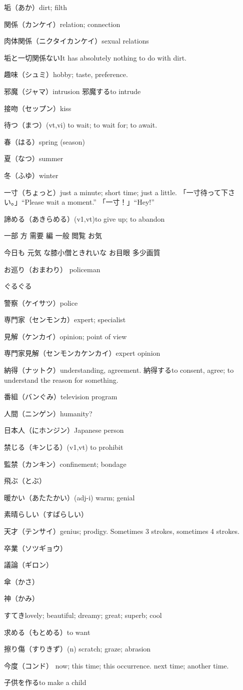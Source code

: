 垢（あか）dirt; filth

関係（カンケイ）relation; connection

肉体関係（ニクタイカンケイ）sexual relations

垢と一切関係ないIt has absolutely nothing to do with dirt.

趣味（シュミ）hobby; taste, preference.

邪魔（ジャマ）intrusion
邪魔するto intrude

接吻（セップン）kiss

待つ（まつ）(vt,vi) to wait; to wait for; to await.

春（はる）spring (season)

夏（なつ）summer

冬（ふゆ）winter

一寸（ちょっと）just a minute; short time; just a little.
「一寸待って下さい。」``Please wait a moment.''
「一寸！」``Hey!''

諦める（あきらめる）(v1,vt)to give up; to abandon

一部
方
需要
編
一般
閲覧
お気

今日も
元気
な膝小僧ときれいな
お目眼
多少画質

お巡り（おまわり）
policeman

ぐるぐる

警察（ケイサツ）police

専門家（センモンカ）expert; specialist

見解（ケンカイ）opinion; point of view

専門家見解（センモンカケンカイ）expert opinion

納得（ナットク）understanding, agreement.
納得するto consent, agree; to understand the reason for something.

番組（バンぐみ）television program

人間（ニンゲン）humanity?

日本人（にホンジン）Japanese person

禁じる（キンじる）(v1,vt) to prohibit

監禁（カンキン）confinement; bondage


飛ぶ（とぶ）

暖かい（あたたかい）(adj-i) warm; genial

素晴らしい（すばらしい）

天才（テンサイ）genius; prodigy.
Sometimes 3 strokes, sometimes 4 strokes.

卒業（ソツギョウ）

議論（ギロン）

傘（かさ）

神（かみ）

すてきlovely; beautiful; dreamy; great; superb; cool

求める（もとめる）to want

擦り傷（すりきず）(n) scratch; graze; abrasion

今度（コンド）
now; this time; this occurrence.
next time; another time.

子供を作るto make a child
